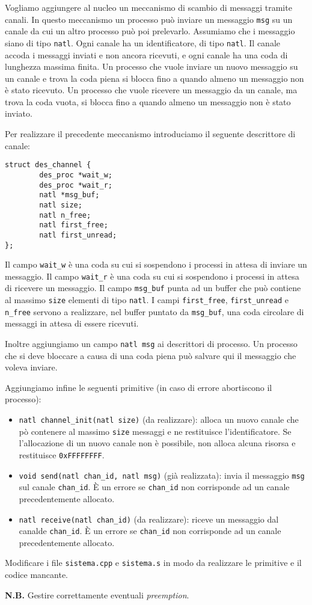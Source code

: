Vogliamo aggiungere al nucleo un meccanismo di scambio di messaggi tramite canali.
In questo meccanismo un processo pu\`o inviare un messaggio \verb|msg| su un canale da cui un altro processo pu\`o poi prelevarlo.
Assumiamo che i messaggio siano di tipo \verb|natl|. Ogni canale ha un identificatore, di tipo \verb|natl|. Il canale accoda
i messaggi inviati e non ancora ricevuti, e ogni canale ha una coda di lunghezza massima finita.
Un processo che vuole inviare un nuovo messaggio su un canale e trova la coda piena si blocca fino a quando almeno un messaggio
non \`e stato ricevuto. Un processo che vuole ricevere un messaggio da un canale, ma trova la coda vuota, si blocca fino a quando
almeno un messaggio non \`e stato inviato.


Per realizzare il precedente meccanismo introduciamo il seguente descrittore di canale:

\begin{verbatim}
struct des_channel { 
        des_proc *wait_w; 
        des_proc *wait_r; 
        natl *msg_buf; 
        natl size; 
        natl n_free; 
        natl first_free; 
        natl first_unread; 
};
\end{verbatim}

Il campo \verb|wait_w| \`e una coda su cui si sospendono i processi in attesa di inviare un messaggio.
Il campo \verb|wait_r| \`e una coda su cui si sospendono i processi in attesa di ricevere un messaggio.
Il campo \verb|msg_buf| punta ad un buffer che pu\`o contiene al massimo \verb|size| elementi di tipo \verb|natl|.
I campi \verb|first_free|, \verb|first_unread| e \verb|n_free|
servono a realizzare, nel buffer puntato da \verb|msg_buf|, una coda circolare di messaggi in attesa di essere ricevuti.

Inoltre aggiungiamo un campo \verb|natl msg| ai descrittori di processo. Un processo che si deve bloccare a causa di una
coda piena pu\`o salvare qui il messaggio che voleva inviare.

Aggiungiamo infine le seguenti primitive (in caso di errore abortiscono il processo):
\begin{itemize}
\item \verb|natl channel_init(natl size)| (da realizzare): alloca un nuovo canale che p\`o contenere
al massimo \verb|size| messaggi e ne restituisce l'identificatore. Se l'allocazione di un nuovo canale non \`e possibile,
non alloca alcuna risorsa e restituisce \verb|0xFFFFFFFF|.
\item \verb|void send(natl chan_id, natl msg)| (gi\`a realizzata): 
	invia il messaggio \verb|msg| sul canale \verb|chan_id|.
	\`E un errore se \verb|chan_id| non corrisponde ad un canale precedentemente allocato.
\item \verb|natl receive(natl chan_id)| (da realizzare):
	riceve un messaggio dal canalde \verb|chan_id|.
	\`E un errore se \verb|chan_id| non corrisponde ad un canale precedentemente allocato.
\end{itemize}

Modificare i file \verb|sistema.cpp| e \verb|sistema.s| in modo da realizzare le primitive e il codice mancante.

{\bf N.B.} Gestire correttamente eventuali {\em preemption}.
